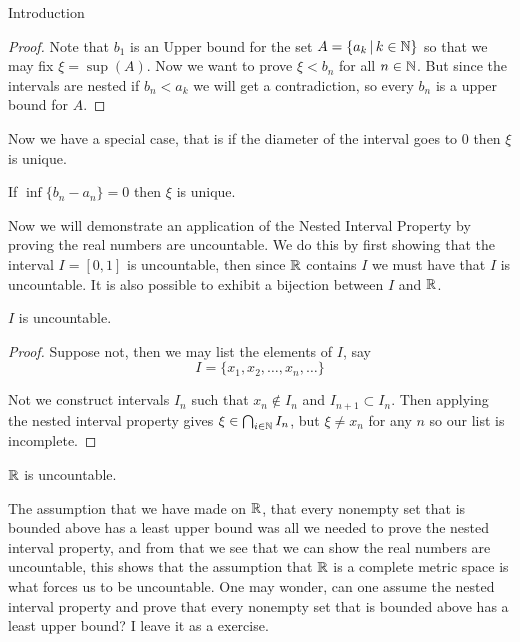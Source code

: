 \begin{chapter}{Introduction}
    
    \begin{proof}
        Note that $b_1$ is an Upper bound for the set $A = \{a_k \, | \, k \in \mathbb{N}\}$ so that we may fix $\xi = \sup(A)$. Now 
        we want to prove $\xi < b_n$ for all $n \in \mathbb{N}$. But since the intervals are nested if $b_n < a_k$ we will get a contradiction, so every $b_n$ is a upper bound 
        for $A$. 
    \end{proof}

    Now we have a special case, that is if the diameter of the interval goes to $0$ then $\xi$ is unique. 

    
    \begin{cor}
        If $\inf\{b_n - a_n\} = 0$ then $\xi$ is unique.
    \end{cor}


    Now we will demonstrate an application of the Nested Interval Property by proving the real numbers are uncountable. We do this by first 
    showing that the interval $I = [0,1]$ is uncountable, then since $\mathbb{R}$ contains $I$ we must have that $I$ is uncountable. It is also possible to 
    exhibit a bijection between $I$ and $\mathbb{R}$. 

    
    \begin{thm}
        $I$ is uncountable.
    \end{thm}

    
    \begin{proof}

        Suppose not, then we may list the elements of $I$, say 
        \[I = \{x_1, x_2, \dots , x_n, \dots \}\]

        Not we construct intervals $I_n$ such that $x_n \notin I_n$ and $I_{n+1} \subset I_n$. Then 
        applying the nested interval property gives $\xi \in \bigcap_{i \in \mathbb{N}} I_n$, but $\xi \neq x_n$ for any $n$ so 
        our list is incomplete.         
    \end{proof}

    
    \begin{cor}
        $\mathbb{R}$ is uncountable.
    \end{cor}

    The assumption that we have made on $\mathbb{R}$, that every nonempty set that is bounded above has a least upper bound was all we needed 
    to prove the nested interval property, and from that we see that we can show the real numbers are uncountable, this shows that the assumption 
    that $\mathbb{R}$ is a complete metric space is what forces us to be uncountable. 
    One may wonder, can one assume the nested interval property and prove that every nonempty set that is bounded above has a least upper bound? 
    I leave it as a exercise. 

\end{chapter}